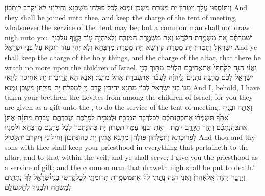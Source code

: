 {וְיִתּוֹסְפוּן עֲלָךְ וְיִטְּרוּן יָת מַטְּרַת מַשְׁכַּן זִמְנָא לְכֹל פּוּלְחַן מַשְׁכְּנָא וְחִילוֹנַי לָא יִקְרַב לְוָתְכוֹן׃}
{And they shall be joined unto thee, and keep the charge of the tent of meeting, whatsoever the service of the Tent may be; but a common man shall not draw nigh unto you.}{}
{וּשְׁמַרְתֶּ֗ם אֵ֚ת מִשְׁמֶ֣רֶת הַקֹּ֔דֶשׁ וְאֵ֖ת מִשְׁמֶ֣רֶת הַמִּזְבֵּ֑חַ וְלֹֽא\maqqaf יִהְיֶ֥ה ע֛וֹד קֶ֖צֶף עַל\maqqaf בְּנֵ֥י יִשְׂרָאֵֽל׃}
{וְתִטְּרוּן יָת מַטְּרַת קוּדְשָׁא וְיָת מַטְּרַת מַדְבְּחָא וְלָא יְהֵי עוֹד רוּגְזָא עַל בְּנֵי יִשְׂרָאֵל׃}
{And ye shall keep the charge of the holy things, and the charge of the altar, that there be wrath no more upon the children of Israel.}{}
{וַאֲנִ֗י הִנֵּ֤ה לָקַ֙חְתִּי֙ אֶת\maqqaf אֲחֵיכֶ֣ם הַלְוִיִּ֔ם מִתּ֖וֹךְ בְּנֵ֣י יִשְׂרָאֵ֑ל לָכֶ֞ם מַתָּנָ֤ה נְתֻנִים֙ לַֽיהֹוָ֔ה לַעֲבֹ֕ד אֶת\maqqaf עֲבֹדַ֖ת אֹ֥הֶל מוֹעֵֽד׃}
{וַאֲנָא הָא קָרֵיבִית יָת אֲחֵיכוֹן לֵיוָאֵי מִגּוֹ בְּנֵי יִשְׂרָאֵל לְכוֹן מַתְּנָא יְהִיבִין קֳדָם יְיָ לְמִפְלַח יָת פּוּלְחַן מַשְׁכַּן זִמְנָא׃}
{And I, behold, I have taken your brethren the Levites from among the children of Israel; for you they are given as a gift unto the \lord, to do the service of the tent of meeting.}{}
{וְאַתָּ֣ה וּבָנֶ֣יךָ אִ֠תְּךָ֠ תִּשְׁמְר֨וּ אֶת\maqqaf כְּהֻנַּתְכֶ֜ם לְכׇל\maqqaf דְּבַ֧ר הַמִּזְבֵּ֛חַ וּלְמִבֵּ֥ית לַפָּרֹ֖כֶת וַעֲבַדְתֶּ֑ם עֲבֹדַ֣ת מַתָּנָ֗ה אֶתֵּן֙ אֶת\maqqaf כְּהֻנַּתְכֶ֔ם וְהַזָּ֥ר הַקָּרֵ֖ב יוּמָֽת׃ \petucha }
{וְאַתְּ וּבְנָךְ עִמָּךְ תִּטְּרוּן יָת כְּהוּנַּתְכוֹן לְכָל פִּתְגָם מַדְבְּחָא וּלְמִגָּיו לְפָרוּכְתָּא וְתִפְלְחוּן פּוּלְחַן מַתְּנָא אֶתֵּין יָת כְּהוּנַּתְכוֹן וְחִילוֹנַי דְּיִקְרַב יִתְקְטִיל׃}
{And thou and thy sons with thee shall keep your priesthood in everything that pertaineth to the altar, and to that within the veil; and ye shall serve; I give you the priesthood as a service of gift; and the common man that draweth nigh shall be put to death.’}{}
{וַיְדַבֵּ֣ר יְהֹוָה֮ אֶֽל\maqqaf אַהֲרֹן֒ וַאֲנִי֙ הִנֵּ֣ה נָתַ֣תִּֽי לְךָ֔ אֶת\maqqaf מִשְׁמֶ֖רֶת תְּרוּמֹתָ֑י לְכׇל\maqqaf קׇדְשֵׁ֣י בְנֵֽי\maqqaf יִ֠שְׂרָאֵ֠ל לְךָ֨ נְתַתִּ֧ים לְמׇשְׁחָ֛ה וּלְבָנֶ֖יךָ לְחׇק\maqqaf עוֹלָֽם׃}
